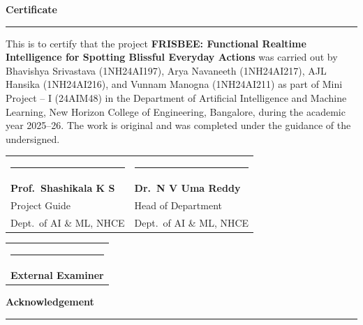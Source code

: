\documentclass[11pt, a4paper]{report}
\begin{document}
\newpage\thispagestyle{plain}
\vspace*{1.4cm}
\begin{center}

  {\Large\bfseries Certificate}\\[7pt]
  {\color{accent}\rule{0.38\textwidth}{0.4pt}}
\end{center}
\vspace{0.9cm}

This is to certify that the project \textbf{FRISBEE: Functional Realtime
Intelligence for Spotting Blissful Everyday Actions} was carried out by
Bhavishya Srivastava (1NH24AI197), Arya Navaneeth (1NH24AI217), AJL Hansika
(1NH24AI216), and Vunnam Manogna (1NH24AI211) as part of Mini Project -- I
(24AIM48) in the Department of Artificial Intelligence and Machine Learning,
New Horizon College of Engineering, Bangalore, during the academic year
2025--26. The work is original and was completed under the guidance of the
undersigned.

\vspace{3.2cm}

\begin{tabular}{@{}p{6.2cm}p{6.2cm}@{}}
  \rule{5.4cm}{0.3pt}            & \rule{5.4cm}{0.3pt}           \\[5pt]
  \textbf{Prof.\ Shashikala K S} & \textbf{Dr.\ N V Uma Reddy}   \\
  Project Guide                  & Head of Department             \\
  Dept.\ of AI \& ML, NHCE      & Dept.\ of AI \& ML, NHCE      \\
\end{tabular}

\vspace{2.2cm}

\begin{tabular}{@{}p{6.2cm}@{}}
  \rule{5.4cm}{0.3pt} \\[5pt]
  \textbf{External Examiner}
\end{tabular}

\newpage\thispagestyle{plain}
\vspace*{1.4cm}
\begin{center}
  {\Large\bfseries Acknowledgement}\\[7pt]
  {\color{accent}\rule{0.38\textwidth}{0.4pt}}
\end{center}
\vspace{0.9cm}
\end{document}
